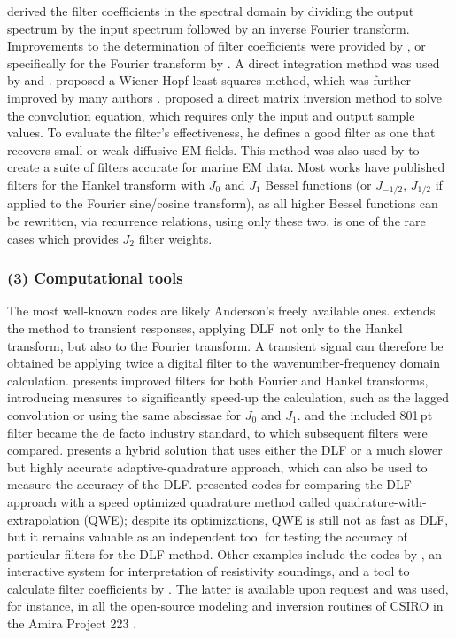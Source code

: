 \documentclass[paper,twocolumn,twoside]{geophysics}
\begin{document}
\cite{PhD.70.Ghosh} derived the filter coefficients in the spectral domain by
dividing the output spectrum by the input spectrum followed by an inverse
Fourier transform. Improvements to the determination of filter coefficients
were provided by \cite{EXG.75.ONeill, GEO.77.Nyman, GEO.82.Das}, or
specifically for the Fourier transform by \cite{GP.86.Nissen}. A direct
integration method was used by \cite{GP.76.Bichara} and \cite{GP.78.Bernabini}.
\cite{GP.79.Koefoed} proposed a Wiener-Hopf least-squares method, which was
further improved by many authors \citep{GP.82.Guptasarma, GEO.1982.Murakami,
GP.97.Guptasarma}. \cite{GP.07.Kong} proposed a direct matrix inversion method
to solve the convolution equation, which requires only the input and output
sample values. To evaluate the filter's effectiveness, he defines a good filter
as one that recovers small or weak diffusive EM fields. This method was also
used by \cite{GEO.09.Key, GEO.12.Key} to create a suite of filters accurate for
marine EM data. Most works have published filters for the Hankel transform with
$J_0$ and $J_1$ Bessel functions (or $J_{-1/2}$, $J_{1/2}$ if applied to the
Fourier sine/cosine transform), as all higher Bessel functions can be
rewritten, via recurrence relations, using only these two.
\cite{GP.94.Mohsen} is one of the rare cases which provides $J_2$ filter
weights.

\subsubsection{(3) Computational tools}

The most well-known codes are likely Anderson's freely available ones.
\cite{USGS.73.Anderson} extends the method to transient responses, applying DLF
not only to the Hankel transform, but also to the Fourier transform. A
transient signal can therefore be obtained be applying twice a digital filter
to the wavenumber-frequency domain calculation. \cite{USGS.75.Anderson,
GEO.79.Anderson} presents improved filters for both Fourier and Hankel
transforms, introducing measures to significantly speed-up the calculation,
such as the lagged convolution or using the same abscissae for $J_0$ and $J_1$.
\cite{TMS.82.Anderson} and the included 801\,pt filter became the de facto
industry standard, to which subsequent filters were compared.
\cite{GEO.89.Anderson} presents a hybrid solution that uses either the DLF or a
much slower but highly accurate adaptive-quadrature approach, which can also be
used to measure the accuracy of the DLF. \cite{GEO.12.Key} presented codes for
comparing the DLF approach with a speed optimized quadrature method called
quadrature-with-extrapolation (QWE); despite its optimizations, QWE is still
not as fast as DLF, but it remains valuable as an independent tool for testing
the accuracy of particular filters for the DLF method. Other examples include
the codes by \cite{GP.75.Johansen}, an interactive system for interpretation of
resistivity soundings, and a tool to calculate filter coefficients by
\cite{GP.90.Christensen}. The latter is available upon request and was used,
for instance, in all the open-source modeling and inversion routines of CSIRO
in the Amira Project 223 \citep{ASEG.07.Raiche}.
\end{document}
